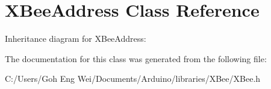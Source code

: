 \hypertarget{class_x_bee_address}{}\section{X\+Bee\+Address Class Reference}
\label{class_x_bee_address}


Inheritance diagram for X\+Bee\+Address\+:


The documentation for this class was generated from the following file\+:\begin{DoxyCompactItemize}
\item 
C\+:/\+Users/\+Goh Eng Wei/\+Documents/\+Arduino/libraries/\+X\+Bee/X\+Bee.\+h\end{DoxyCompactItemize}
